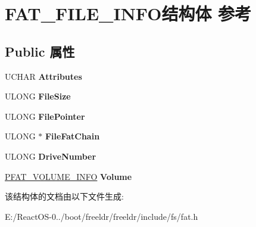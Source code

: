 \hypertarget{struct_f_a_t___f_i_l_e___i_n_f_o}{}\section{F\+A\+T\+\_\+\+F\+I\+L\+E\+\_\+\+I\+N\+F\+O结构体 参考}
\label{struct_f_a_t___f_i_l_e___i_n_f_o}
\subsection*{Public 属性}
\begin{DoxyCompactItemize}
\item 
\mbox{\label{struct_f_a_t___f_i_l_e___i_n_f_o_a41001fc752204810c058738824bb4048}} 
U\+C\+H\+AR {\bfseries Attributes}
\item 
\mbox{\label{struct_f_a_t___f_i_l_e___i_n_f_o_a55b69a136cbb68a426aa3ca2c27bd492}} 
U\+L\+O\+NG {\bfseries File\+Size}
\item 
\mbox{\label{struct_f_a_t___f_i_l_e___i_n_f_o_ad2c63f6f611f628a9a277d2865d73414}} 
U\+L\+O\+NG {\bfseries File\+Pointer}
\item 
\mbox{\label{struct_f_a_t___f_i_l_e___i_n_f_o_a0f97099f3b4a7b8c84bd690a62b7aafa}} 
U\+L\+O\+NG $\ast$ {\bfseries File\+Fat\+Chain}
\item 
\mbox{\label{struct_f_a_t___f_i_l_e___i_n_f_o_a5479d78fca6f202454bc97651440891c}} 
U\+L\+O\+NG {\bfseries Drive\+Number}
\item 
\mbox{\label{struct_f_a_t___f_i_l_e___i_n_f_o_a94af9771e3410bd277df7789811be0be}} 
\hyperlink{struct___f_a_t___v_o_l_u_m_e___i_n_f_o}{P\+F\+A\+T\+\_\+\+V\+O\+L\+U\+M\+E\+\_\+\+I\+N\+FO} {\bfseries Volume}
\end{DoxyCompactItemize}


该结构体的文档由以下文件生成\+:\begin{DoxyCompactItemize}
\item 
E\+:/\+React\+O\+S-\/0../boot/freeldr/freeldr/include/fs/fat.\+h\end{DoxyCompactItemize}
